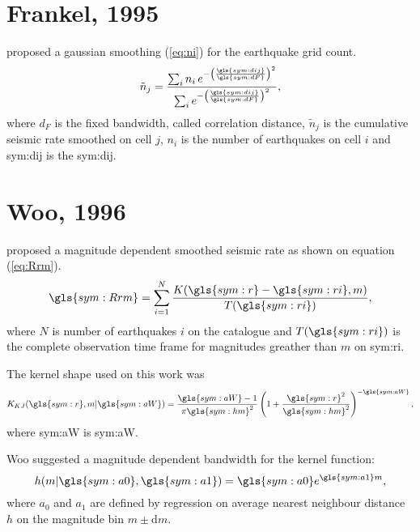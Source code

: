 \documentclass[final]{beamer}
\begin{document}
\begin{poster}
\newcolumn

\section{Frankel, 1995}
\footnotesize
\citet{frankel_1995} proposed a gaussian smoothing (\ref{eq:ni}) for the
earthquake grid count.
\small
\begin{equation}
	\ensuremath{
		\tilde{n}_j = \frac{ \sum_{i} n_i \,e^{ - \left(\frac{\gls{sym:dij}}{\gls{sym:dF}}\right)^2}}
						   { \sum_{i}     e^{ - \left(\frac{\gls{sym:dij}}{\gls{sym:dF}}\right)^2}},
	}
	\label{eq:ni}
\end{equation}
\footnotesize
where $d_F$ is the \alert{fixed bandwidth}, called correlation distance,
$\tilde{n}_j$ is the cumulative seismic rate smoothed on cell $j$,
$n_i$ is the number of earthquakes on cell $i$ and \gls{sym:dij} is
the \glsdesc{sym:dij}.

\section{Woo, 1996}
\footnotesize
\citet{woo_1996} proposed a magnitude dependent smoothed seismic rate
as shown on equation (\ref{eq:Rrm}).
\footnotesize
		\begin{equation}
			\ensuremath{
				\gls{sym:Rrm} = \sum_{i=1}^{N} \frac{ K(\gls{sym:r} - \gls{sym:ri}, m)}
													{T({\gls{sym:ri})}},
			}
			\label{eq:Rrm}
		\end{equation}
\footnotesize
	where $N$ is number of earthquakes $i$ on the catalogue 
	and $T(\gls{sym:ri})$ is the complete observation time frame for magnitudes
	greather than $m$ on \gls{sym:ri}.

The kernel shape used on this work was
\footnotesize
		\begin{equation}
			\ensuremath{
				K_{KJ}(\gls{sym:r}, m \arrowvert \gls{sym:aW}) =  \frac{  \gls{sym:aW}  -1}{\pi\gls{sym:hm}^2}
									\left( 1 + \frac{\gls{sym:r}^2}{\gls{sym:hm}^2} \right)^{-\gls{sym:aW}},
			}
			\label{eq:k_kj}
		\end{equation}
\footnotesize
	where \gls{sym:aW} is \glsdesc{sym:aW}.

Woo suggested a \alert{magnitude dependent bandwidth} for the kernel function:  
\small
	\begin{equation}
		\ensuremath{
			h(m\arrowvert \gls{sym:a0}, \gls{sym:a1}) = \gls{sym:a0}e^{\gls{sym:a1}m},
		}
		\label{eq:hm}
	\end{equation}
\footnotesize
where $a_0$ and $a_1$ are defined by regression on average nearest neighbour
distance $h$ on the magnitude bin $m \pm \mathrm{d}m$.


\end{poster}
\end{document}

